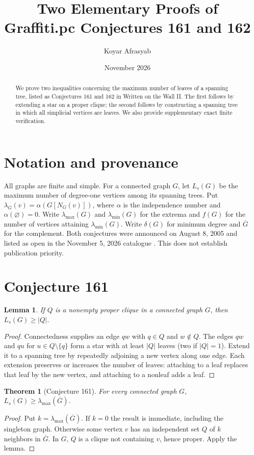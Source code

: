\documentclass[11pt]{article}
\title{Two Elementary Proofs of Graffiti.pc Conjectures 161 and 162}
\author{Koyar Afrasyab}
\date{November 2026}
\newtheorem{theorem}{Theorem}
\newtheorem{lemma}{Lemma}
\begin{document}
\maketitle
\begin{abstract}
We prove two inequalities concerning the maximum number of leaves of a spanning tree, listed as Conjectures 161 and 162 in Written on the Wall II. The first follows by extending a star on a proper clique; the second follows by constructing a spanning tree in which all simplicial vertices are leaves. We also provide supplementary exact finite verification.
\end{abstract}
\section{Notation and provenance}
All graphs are finite and simple. For a connected graph $G$, let $L_s(G)$ be the maximum number of degree-one vertices among its spanning trees. Put $\lambda_G(v)=\alpha(G[N_G(v)])$, where $\alpha$ is the independence number and $\alpha(\varnothing)=0$. Write $\lambda_{\max}(G)$ and $\lambda_{\min}(G)$ for the extrema and $f(G)$ for the number of vertices attaining $\lambda_{\min}(G)$. Write $\delta(G)$ for minimum degree and $\overline G$ for the complement. Both conjectures were announced on August 8, 2005 and listed as open in the November 5, 2026 catalogue \cite{wow}. This does not establish publication priority.
\section{Conjecture 161}
\begin{lemma}
If $Q$ is a nonempty proper clique in a connected graph $G$, then $L_s(G)\ge |Q|$.
\end{lemma}
\begin{proof}
Connectedness supplies an edge $qw$ with $q\in Q$ and $w\notin Q$. The edges $qw$ and $qu$ for $u\in Q\setminus\{q\}$ form a star with at least $|Q|$ leaves (two if $|Q|=1$). Extend it to a spanning tree by repeatedly adjoining a new vertex along one edge. Each extension preserves or increases the number of leaves: attaching to a leaf replaces that leaf by the new vertex, and attaching to a nonleaf adds a leaf.
\end{proof}
\begin{theorem}[Conjecture 161]
For every connected graph $G$, $L_s(G)\ge\lambda_{\max}(\overline G)$.
\end{theorem}
\begin{proof}
Put $k=\lambda_{\max}(\overline G)$. If $k=0$ the result is immediate, including the singleton graph. Otherwise some vertex $v$ has an independent set $Q$ of $k$ neighbors in $\overline G$. In $G$, $Q$ is a clique not containing $v$, hence proper. Apply the lemma.
\end{proof}
\end{document}
